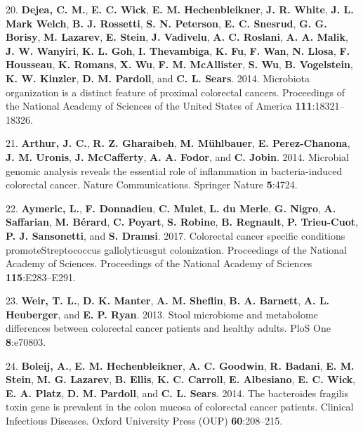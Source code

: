 \documentclass[12pt,]{article}
\begin{document}
\hypertarget{ref-dejea_microbiota_2014}{}
20. \textbf{Dejea, C. M.}, \textbf{E. C. Wick}, \textbf{E. M.
Hechenbleikner}, \textbf{J. R. White}, \textbf{J. L. Mark Welch},
\textbf{B. J. Rossetti}, \textbf{S. N. Peterson}, \textbf{E. C.
Snesrud}, \textbf{G. G. Borisy}, \textbf{M. Lazarev}, \textbf{E. Stein},
\textbf{J. Vadivelu}, \textbf{A. C. Roslani}, \textbf{A. A. Malik},
\textbf{J. W. Wanyiri}, \textbf{K. L. Goh}, \textbf{I. Thevambiga},
\textbf{K. Fu}, \textbf{F. Wan}, \textbf{N. Llosa}, \textbf{F.
Housseau}, \textbf{K. Romans}, \textbf{X. Wu}, \textbf{F. M.
McAllister}, \textbf{S. Wu}, \textbf{B. Vogelstein}, \textbf{K. W.
Kinzler}, \textbf{D. M. Pardoll}, and \textbf{C. L. Sears}. 2014.
Microbiota organization is a distinct feature of proximal colorectal
cancers. Proceedings of the National Academy of Sciences of the United
States of America \textbf{111}:18321--18326.

\hypertarget{ref-ecoli_Arthur_2014}{}
21. \textbf{Arthur, J. C.}, \textbf{R. Z. Gharaibeh}, \textbf{M.
Mühlbauer}, \textbf{E. Perez-Chanona}, \textbf{J. M. Uronis}, \textbf{J.
McCafferty}, \textbf{A. A. Fodor}, and \textbf{C. Jobin}. 2014.
Microbial genomic analysis reveals the essential role of inflammation in
bacteria-induced colorectal cancer. Nature Communications. Springer
Nature \textbf{5}:4724.

\hypertarget{ref-strep_Aymeric_2017}{}
22. \textbf{Aymeric, L.}, \textbf{F. Donnadieu}, \textbf{C. Mulet},
\textbf{L. du Merle}, \textbf{G. Nigro}, \textbf{A. Saffarian},
\textbf{M. Bérard}, \textbf{C. Poyart}, \textbf{S. Robine}, \textbf{B.
Regnault}, \textbf{P. Trieu-Cuot}, \textbf{P. J. Sansonetti}, and
\textbf{S. Dramsi}. 2017. Colorectal cancer specific conditions
promoteStreptococcus gallolyticusgut colonization. Proceedings of the
National Academy of Sciences. Proceedings of the National Academy of
Sciences \textbf{115}:E283--E291.

\hypertarget{ref-weir_stool_2013}{}
23. \textbf{Weir, T. L.}, \textbf{D. K. Manter}, \textbf{A. M. Sheflin},
\textbf{B. A. Barnett}, \textbf{A. L. Heuberger}, and \textbf{E. P.
Ryan}. 2013. Stool microbiome and metabolome differences between
colorectal cancer patients and healthy adults. PloS One
\textbf{8}:e70803.

\hypertarget{ref-bfrag_Boleij_2014}{}
24. \textbf{Boleij, A.}, \textbf{E. M. Hechenbleikner}, \textbf{A. C.
Goodwin}, \textbf{R. Badani}, \textbf{E. M. Stein}, \textbf{M. G.
Lazarev}, \textbf{B. Ellis}, \textbf{K. C. Carroll}, \textbf{E.
Albesiano}, \textbf{E. C. Wick}, \textbf{E. A. Platz}, \textbf{D. M.
Pardoll}, and \textbf{C. L. Sears}. 2014. The bacteroides fragilis toxin
gene is prevalent in the colon mucosa of colorectal cancer patients.
Clinical Infectious Diseases. Oxford University Press (OUP)
\textbf{60}:208--215.
\end{document}
